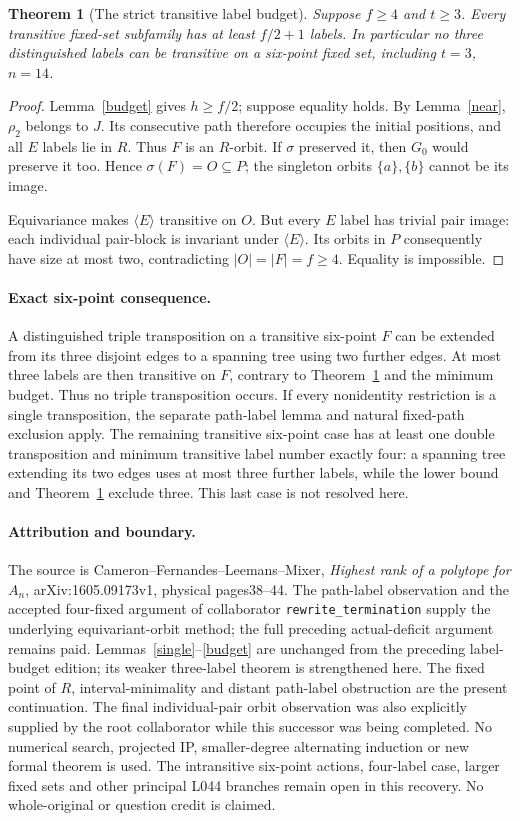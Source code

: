 \documentclass[11pt,a4paper]{article}
\newtheorem{theorem}[lemma]{Theorem}
\newcommand{\gen}[1]{\langle#1\rangle}
\begin{document}
\begin{theorem}[The strict transitive label budget]\label{strict}
Suppose $f\geq4$ and $t\geq3$. Every transitive fixed-set subfamily
has at least $f/2+1$ labels. In particular no three distinguished
labels can be transitive on a six-point fixed set, including
$t=3$, $n=14$.
\end{theorem}
\begin{proof}
Lemma~\ref{budget} gives $h\geq f/2$; suppose equality holds.
By Lemma~\ref{near}, $\rho_2$ belongs to $J$. Its consecutive path
therefore occupies the initial positions, and all $E$ labels lie in
$R$. Thus $F$ is an $R$-orbit. If $\sigma$ preserved it, then $G_0$
would preserve it too. Hence $\sigma(F)=O\subseteq P$; the singleton
orbits $\{a\},\{b\}$ cannot be its image.

Equivariance makes $\gen{E}$ transitive on $O$. But every $E$ label
has trivial pair image: each individual pair-block is invariant under
$\gen{E}$. Its orbits in $P$ consequently have size at most two,
contradicting $|O|=|F|=f\geq4$. Equality is impossible.
\end{proof}

\paragraph{Exact six-point consequence.}
A distinguished triple transposition on a transitive six-point $F$
can be extended from its three disjoint edges to a spanning tree using
two further edges. At most three labels are then transitive on $F$,
contrary to Theorem~\ref{strict} and the minimum budget. Thus no triple
transposition occurs. If every nonidentity restriction is a single
transposition, the separate path-label lemma and natural fixed-path
exclusion apply. The remaining transitive six-point case has at least
one double transposition and minimum transitive label number exactly
four: a spanning tree extending its two edges uses at most three
further labels, while the lower bound and Theorem~\ref{strict} exclude
three. This last case is not resolved here.

\paragraph{Attribution and boundary.}
The source is Cameron--Fernandes--Leemans--Mixer,
\emph{Highest rank of a polytope for $A_n$}, arXiv:1605.09173v1,
physical pages38--44. The path-label observation and the accepted four-fixed argument of collaborator
\texttt{rewrite\_termination} supply the underlying equivariant-orbit
method; the full preceding actual-deficit argument remains paid.
Lemmas~\ref{single}--\ref{budget} are unchanged from the preceding
label-budget edition; its weaker three-label theorem is strengthened here. The fixed point of $R$, interval-minimality and distant
path-label obstruction are the present continuation. The final
individual-pair orbit observation was also explicitly supplied by the
root collaborator while this successor was being completed. No numerical
search, projected IP, smaller-degree alternating induction or new
formal theorem is used. The intransitive six-point actions, four-label
case, larger fixed sets and other principal L044 branches remain open
in this recovery. No whole-original or question credit is claimed.
\end{document}
